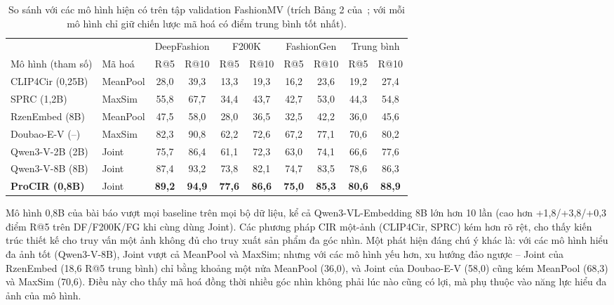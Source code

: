 \begin{table}[h]
\centering
\caption{So sánh với các mô hình hiện có trên tập validation FashionMV (trích Bảng 2 của~\cite{yuan2026fashionmv}; với mỗi mô hình chỉ giữ chiến lược mã hoá có điểm trung bình tốt nhất).}
\label{tab:paper-comparison}
\small
\begin{tabular}{llcccccccc}
\toprule
& & \multicolumn{2}{c}{DeepFashion} & \multicolumn{2}{c}{F200K} & \multicolumn{2}{c}{FashionGen} & \multicolumn{2}{c}{Trung bình} \\
\cmidrule(lr){3-4}\cmidrule(lr){5-6}\cmidrule(lr){7-8}\cmidrule(lr){9-10}
Mô hình (tham số) & Mã hoá & R@5 & R@10 & R@5 & R@10 & R@5 & R@10 & R@5 & R@10 \\
\midrule
CLIP4Cir (0,25B)   & MeanPool & 28,0 & 39,3 & 13,3 & 19,3 & 16,2 & 23,6 & 19,2 & 27,4 \\
SPRC (1,2B)        & MaxSim   & 55,8 & 67,7 & 34,4 & 43,7 & 42,7 & 53,0 & 44,3 & 54,8 \\
RzenEmbed (8B)     & MeanPool & 47,5 & 58,0 & 28,0 & 36,5 & 32,5 & 42,2 & 36,0 & 45,6 \\
Doubao-E-V (--)    & MaxSim   & 82,3 & 90,8 & 62,2 & 72,6 & 67,2 & 77,1 & 70,6 & 80,2 \\
Qwen3-V-2B (2B)    & Joint    & 75,7 & 86,4 & 61,1 & 72,3 & 63,0 & 74,1 & 66,6 & 77,6 \\
Qwen3-V-8B (8B)    & Joint    & 87,4 & 93,2 & 73,8 & 82,1 & 74,7 & 83,5 & 78,6 & 86,3 \\
\midrule
\textbf{ProCIR (0,8B)} & Joint & \textbf{89,2} & \textbf{94,9} & \textbf{77,6} & \textbf{86,6} & \textbf{75,0} & \textbf{85,3} & \textbf{80,6} & \textbf{88,9} \\
\bottomrule
\end{tabular}
\end{table}

Mô hình 0,8B của bài báo vượt mọi baseline trên mọi bộ dữ liệu, kể cả Qwen3-VL-Embedding 8B lớn hơn 10 lần (cao hơn +1,8/+3,8/+0,3 điểm R@5 trên DF/F200K/FG khi cùng dùng Joint). Các phương pháp CIR một-ảnh (CLIP4Cir, SPRC) kém hơn rõ rệt, cho thấy kiến trúc thiết kế cho truy vấn một ảnh không đủ cho truy xuất sản phẩm đa góc nhìn. Một phát hiện đáng chú ý khác là: với các mô hình hiểu đa ảnh tốt (Qwen3-V-8B), Joint vượt cả MeanPool và MaxSim; nhưng với các mô hình yếu hơn, xu hướng đảo ngược -- Joint của RzenEmbed (18,6 R@5 trung bình) chỉ bằng khoảng một nửa MeanPool (36,0), và Joint của Doubao-E-V (58,0) cũng kém MeanPool (68,3) và MaxSim (70,6). Điều này cho thấy mã hoá đồng thời nhiều góc nhìn không phải lúc nào cũng có lợi, mà phụ thuộc vào năng lực hiểu đa ảnh của mô hình.

